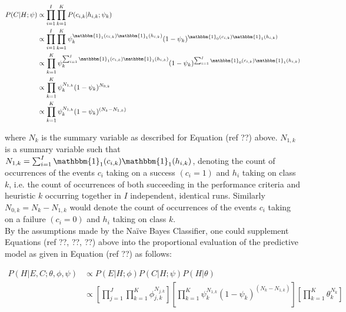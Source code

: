 \begin{equation}
    \begin{split}
        P(C\vert H;  \psi)
        &\propto\prod_{i=1}^{I} \prod_{k=1}^{K} P(c_{i,k} \vert h_{i,k} ; \psi_{k})  \\
        &\propto \prod_{i=1}^{I} \prod_{k=1}^{K} \psi_{k}^{\mathbbm{1}_{1}(c_{i,k})\mathbbm{1}_{1}(h_{i,k})} (1 - \psi_{k})^{\mathbbm{1}_{0}(c_{i,k})\mathbbm{1}_{1}(h_{i,k})}\\
        &\propto \prod_{k=1}^{K} \psi_{k}^{\sum_{i=1}^{I} \mathbbm{1}_{1}(c_{i,k})\mathbbm{1}_{1}(h_{i,k})} (1 - \psi_{k})^{\sum_{i=1}^{I} \mathbbm{1}_{0}(c_{i,k})\mathbbm{1}_{1}(h_{i,k})}\\
        &\propto \prod_{k=1}^{K} \psi_{k}^{N_{1,k}} (1 - \psi_{k})^{N_{0,k}} \\
        &\propto \prod_{k=1}^{K} \psi_{k}^{N_{1,k}} (1 - \psi_{k})^{(N_{k} - N_{1,k})}
    \end{split}
\end{equation}

where $N_{k}$ is the summary variable as described for Equation (ref ??) above.
$N_{1,k}$ is a summary variable such that $N_{1,k} = \sum_{i=1}^{I}
\mathbbm{1}_{1}(c_{i,k})\mathbbm{1}_{1}(h_{i,k})$, denoting the count of
occurrences of the events $c_{i}$ taking on a success $(c_{i}=1)$ and $h_{i}$
taking on class $k$, i.e. the count of occurrences of both succeeding in the
performance criteria and heuristic $k$ occurring together in $I$ independent,
identical runs. Similarly $N_{0,k} = N_{k} - N_{1,k}$ would denote the count of
occurrences of the events $c_{i}$ taking on a failure $(c_{i}=0)$ and $h_{i}$
taking on class $k$. \\
By the assumptions made by the Naïve Bayes Classifier, one could supplement
Equations (ref ??, ??, ??) above into the proportional evaluation of the
predictive model as given in Equation (ref ??) as follows:

\begin{equation}
    \begin{split}
        P(H \vert E, C;  \theta, \phi, \psi)
    &\propto P(E \vert H;  \phi)  P(C \vert H;  \psi) P(H \vert \theta)  \\
    &\propto \left[ \prod_{j=1}^{J} \prod_{k=1}^{K} \phi_{j,k}^{N_{j,k}} \right] \left[ \prod_{k=1}^{K} \psi_{k}^{N_{1,k}} (1 - \psi_{k})^{(N_{k} - N_{1,k})} \right] \left[ \prod_{k=1}^{K} \theta_{k}^{N_{k}} \right]
    \end{split}
\end{equation}


